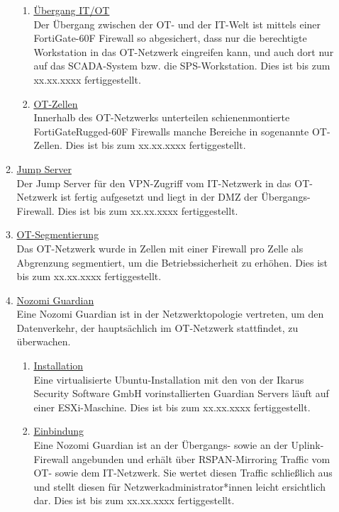 \documentclass[
	headings=optiontotocandhead,%
	oneside,
	numbers=noenddot,%
	toc=flat, %
	10pt, %
	parskip=full, %
	listof=totoc, %
	listof=flat, %
	numbers=noenddot, %
	bibliography=totoc, %
	a4paper,DIV=14,
]{scrartcl}
\begin{document}
\begin{enumerate}[start=1,label={\bfseries Ziel-H \arabic*},leftmargin=*,wide]
\begin{enumerate}[label=\alph*.]
\begin{enumerate}[label=\roman*.]
\item{\underline{Übergang IT/OT}}\\
Der Übergang zwischen der OT- und der IT-Welt ist mittels einer FortiGate-60F Firewall so abgesichert, dass nur die berechtigte Workstation in das OT-Netzwerk eingreifen kann, und auch dort nur auf das SCADA-System bzw. die SPS-Workstation. Dies ist bis zum xx.xx.xxxx fertiggestellt.

\item{\underline{OT-Zellen}}\\
Innerhalb des OT-Netzwerks unterteilen schienenmontierte FortiGateRugged-60F Firewalls manche Bereiche in sogenannte OT-Zellen. Dies ist bis zum xx.xx.xxxx fertiggestellt.
\end{enumerate}

\item{\underline{Jump Server}}\\
Der Jump Server für den VPN-Zugriff vom IT-Netzwerk in das OT-Netzwerk ist fertig aufgesetzt und liegt in der DMZ der Übergangs-Firewall. Dies ist bis zum xx.xx.xxxx fertiggestellt.

\item{\underline{OT-Segmentierung}}\\
Das OT-Netzwerk wurde in Zellen mit einer Firewall pro Zelle als Abgrenzung segmentiert, um die Betriebssicherheit zu erhöhen. Dies ist bis zum xx.xx.xxxx fertiggestellt.

\item{\underline{Nozomi Guardian}}\\
Eine Nozomi Guardian ist in der Netzwerktopologie vertreten, um den Datenverkehr, der hauptsächlich im OT-Netzwerk stattfindet, zu überwachen.
\begin{enumerate}[label=\roman*.]
\item{\underline{Installation}}\\
Eine virtualisierte Ubuntu-Installation mit den von der Ikarus Security Software GmbH vorinstallierten Guardian Servers läuft auf einer ESXi-Maschine. Dies ist bis zum xx.xx.xxxx fertiggestellt.

\item{\underline{Einbindung}}\\
Eine Nozomi Guardian ist an der Übergangs- sowie an der Uplink-Firewall angebunden und erhält über RSPAN-Mirroring Traffic vom OT- sowie dem IT-Netzwerk. Sie wertet diesen Traffic schließlich aus und stellt diesen für Netzwerkadministrator*innen leicht ersichtlich dar. Dies ist bis zum xx.xx.xxxx fertiggestellt.
\end{enumerate}


\end{enumerate}
\end{enumerate}
\end{document}
